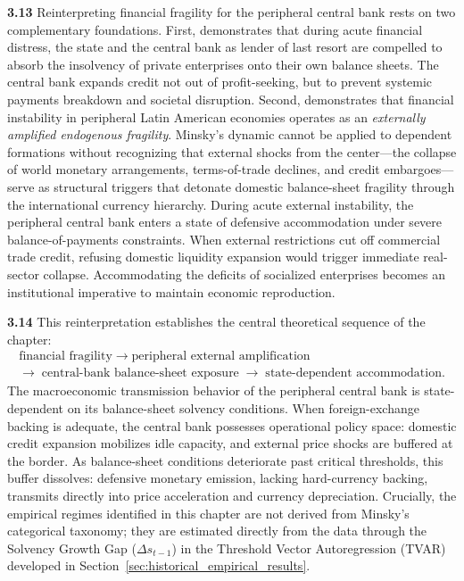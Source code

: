\textbf{3.13} Reinterpreting financial fragility for the peripheral central bank rests on two complementary foundations. First, \citet[p.~21]{Foley2003} demonstrates that during acute financial distress, the state and the central bank as lender of last resort are compelled to absorb the insolvency of private enterprises onto their own balance sheets. The central bank expands credit not out of profit-seeking, but to prevent systemic payments breakdown and societal disruption. Second, \citet{Chamorro2025} demonstrates that financial instability in peripheral Latin American economies operates as an \emph{externally amplified endogenous fragility}. Minsky's dynamic cannot be applied to dependent formations without recognizing that external shocks from the center---the collapse of world monetary arrangements, terms-of-trade declines, and credit embargoes---serve as structural triggers that detonate domestic balance-sheet fragility through the international currency hierarchy. During acute external instability, the peripheral central bank enters a state of defensive accommodation under severe balance-of-payments constraints. When external restrictions cut off commercial trade credit, refusing domestic liquidity expansion would trigger immediate real-sector collapse. Accommodating the deficits of socialized enterprises becomes an institutional imperative to maintain economic reproduction.

\textbf{3.14} This reinterpretation establishes the central theoretical sequence of the chapter:
\[
\begin{gathered}
\text{financial fragility} \;\longrightarrow\; \text{peripheral external amplification} \\
\longrightarrow\; \text{central-bank balance-sheet exposure} \;\longrightarrow\; \text{state-dependent accommodation}.
\end{gathered}
\]
The macroeconomic transmission behavior of the peripheral central bank is state-dependent on its balance-sheet solvency conditions. When foreign-exchange backing is adequate, the central bank possesses operational policy space: domestic credit expansion mobilizes idle capacity, and external price shocks are buffered at the border. As balance-sheet conditions deteriorate past critical thresholds, this buffer dissolves: defensive monetary emission, lacking hard-currency backing, transmits directly into price acceleration and currency depreciation. Crucially, the empirical regimes identified in this chapter are not derived from Minsky's categorical taxonomy; they are estimated directly from the data through the Solvency Growth Gap ($\Delta s_{t-1}$) in the Threshold Vector Autoregression (TVAR) developed in Section~\ref{sec:historical_empirical_results}.
